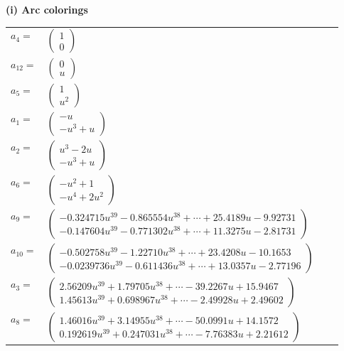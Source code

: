 \documentclass[1p]{elsarticle_modified}
\theoremstyle{definition}
\begin{document}
\flushleft \textbf{(i) Arc colorings}\\
\begin{tabular}{m{7pt} m{180pt} m{7pt} m{180pt} }
\flushright $a_{4}=$&$\begin{pmatrix}1\\0\end{pmatrix}$ \\
\flushright $a_{12}=$&$\begin{pmatrix}0\\u\end{pmatrix}$ \\
\flushright $a_{5}=$&$\begin{pmatrix}1\\u^2\end{pmatrix}$ \\
\flushright $a_{1}=$&$\begin{pmatrix}- u\\- u^3+u\end{pmatrix}$ \\
\flushright $a_{2}=$&$\begin{pmatrix}u^3-2 u\\- u^3+u\end{pmatrix}$ \\
\flushright $a_{6}=$&$\begin{pmatrix}- u^2+1\\- u^4+2 u^2\end{pmatrix}$ \\
\flushright $a_{9}=$&$\begin{pmatrix}-0.324715 u^{39}-0.865554 u^{38}+\cdots+25.4189 u-9.92731\\-0.147604 u^{39}-0.771302 u^{38}+\cdots+11.3275 u-2.81731\end{pmatrix}$ \\
\flushright $a_{10}=$&$\begin{pmatrix}-0.502758 u^{39}-1.22710 u^{38}+\cdots+23.4208 u-10.1653\\-0.0239736 u^{39}-0.611436 u^{38}+\cdots+13.0357 u-2.77196\end{pmatrix}$ \\
\flushright $a_{3}=$&$\begin{pmatrix}2.56209 u^{39}+1.79705 u^{38}+\cdots-39.2267 u+15.9467\\1.45613 u^{39}+0.698967 u^{38}+\cdots-2.49928 u+2.49602\end{pmatrix}$ \\
\flushright $a_{8}=$&$\begin{pmatrix}1.46016 u^{39}+3.14955 u^{38}+\cdots-50.0991 u+14.1572\\0.192619 u^{39}+0.247031 u^{38}+\cdots-7.76383 u+2.21612\end{pmatrix}$ \\

\end{tabular}
\end{document}
